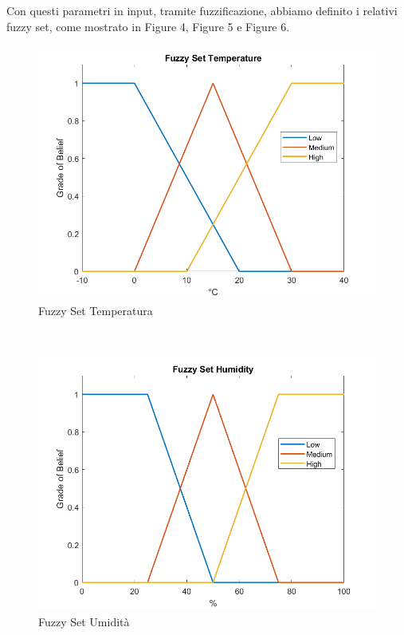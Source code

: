 \documentclass[conference,10pt]{IEEEtran}
\begin{document}
Con questi parametri in input, tramite fuzzificazione, abbiamo definito i relativi fuzzy set, come mostrato in Figure 4, Figure 5 e Figure 6.
\begin{figure}[ht]
	\centering
	\includegraphics[width=1\linewidth]{images/temp_fs.png}
	\caption{Fuzzy Set Temperatura}
	\label{fig:MAD}
\end{figure}\\
\begin{figure}[ht]
	\centering
	\includegraphics[width=1\linewidth]{images/humi_fs.png}
	\caption{Fuzzy Set Umidità}
	\label{fig:MAD}
\end{figure}\\
\end{document}
